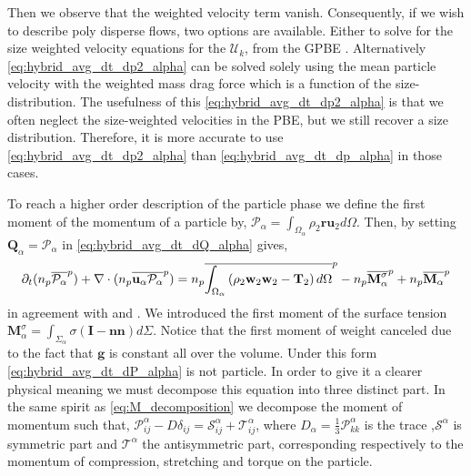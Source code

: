 Then we observe that the weighted velocity term vanish. 
Consequently, if we wish to describe poly disperse flows, two options are available. 
Either to solve for the size weighted velocity equations for the $\mathcal{U}_k$, from the GPBE \citet{fox2023generalized,marchisio2013computational}.
Alternatively \ref{eq:hybrid_avg_dt_dp2_alpha} can be solved solely using the mean particle velocity with the weighted mass drag force which is a function of the size-distribution.  
The usefulness of this \ref{eq:hybrid_avg_dt_dp2_alpha} is that we often neglect the size-weighted velocities in the PBE, but we still recover a size distribution. 
Therefore, it is more accurate to use \ref{eq:hybrid_avg_dt_dp2_alpha} than \ref{eq:hybrid_avg_dt_dp_alpha} in those cases. 

To reach a higher order description of the particle phase we define the first moment of the momentum of a particle by, $\mathcal{P}_\alpha = \int_{\Omega_\alpha} \rho_2 \textbf{r} \textbf{u}_2 d\Omega$.
Then, by setting $\textbf{Q}_\alpha = \mathcal{P}_\alpha$ in \ref{eq:hybrid_avg_dt_dQ_alpha} gives,
\begin{multline}
    \partial_t (n_p\overline{\mathcal{P}_\alpha}^{p})
    + \mathbf{\nabla}\cdot (n_p\overline{  \textbf{u}_\alpha \mathcal{P}_\alpha}^{p})
    = n_p\overline{\int_{\Omega_\alpha} \left(
        \rho_2 \textbf{w}_2 \textbf{w}_2
        - \mathbf{T}_2
        \right) d\Omega}^{p}
        - n_p\overline{\textbf{M}_\alpha^\sigma}^{p}
        + n_p\overline{\textbf{M}_\alpha}^{p}
    \label{eq:hybrid_avg_dt_dP_alpha}
\end{multline}
in agreement with \citet[Appendix C]{morel2015mathematical} and \citet[chapter 1]{zaepffel2011modelisation}.
We introduced the first moment of the surface tension $\textbf{M}_\alpha^\sigma = \int_{\Sigma_\alpha} \sigma (\textbf{I} - \textbf{nn}) d\Sigma$.
Notice that the first moment of weight canceled due to the fact that $\textbf{g}$ is constant all over the volume. 
Under this form \ref{eq:hybrid_avg_dt_dP_alpha} is not particle. 
In order to give it a clearer physical meaning we must decompose this equation into three distinct part. 
In the same spirit as \ref{eq:M_decomposition} we decompose the moment of momentum such that, $\mathcal{P}^\alpha_{ij} - D\delta_{ij} = \mathcal{S}^\alpha_{ij}+\mathcal{T}^\alpha_{ij}$, where $D_\alpha = \frac{1}{3}\mathcal{P}^\alpha_{kk}$ is the trace ,$\mathcal{S}^\alpha$ is symmetric part and $\mathcal{T}^\alpha$ the antisymmetric part, corresponding respectively to the momentum of compression, stretching and torque on the particle. 

